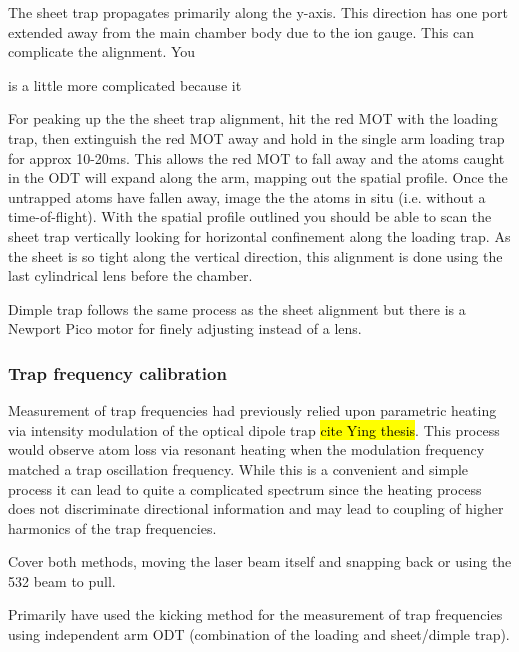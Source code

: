 






The sheet trap propagates primarily along the y-axis. This direction has one port extended away from the main chamber body due to the ion gauge. This can complicate the alignment. You

is a little more complicated because it 



For peaking up the the sheet trap alignment, hit the red MOT with the loading trap, then extinguish the red MOT away and hold in the single arm loading trap for approx 10-20ms. This allows the red MOT to fall away and the atoms caught in the ODT will expand along the arm, mapping out the spatial profile. Once the untrapped atoms have fallen away, image the the atoms in situ (i.e. without a time-of-flight). With the spatial profile outlined you should be able to scan the sheet trap vertically looking for horizontal confinement along the loading trap. As the sheet is so tight along the vertical direction, this alignment is done using the last cylindrical lens before the chamber. 

Dimple trap follows the same process as the sheet alignment but there is a Newport Pico motor for finely adjusting instead of a lens.


\subsubsection{Trap frequency calibration} \label{sssec:1064_trap_freq}

Measurement of trap frequencies had previously relied upon parametric heating via intensity modulation of the optical dipole trap \hl{cite Ying thesis}. This process would observe atom loss via resonant heating when the modulation frequency matched a trap oscillation frequency. While this is a convenient and simple process it can lead to quite a complicated spectrum since the heating process does not discriminate directional information and may lead to coupling of higher harmonics of the trap frequencies. 

Cover both methods, moving the laser beam itself and snapping back or using the 532 beam to pull.

Primarily have used the kicking method for the measurement of trap frequencies using independent arm ODT (combination of the loading and sheet/dimple trap). 

